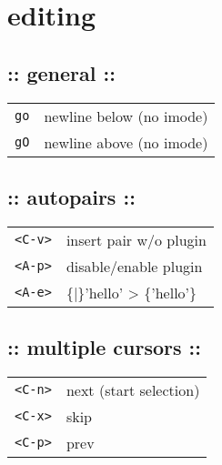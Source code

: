 \section{\hrulefill editing\hrulefill}
\subsection{:: general ::}
\begin{tabular}{@{}ll@{}}
    \verb!go!       & newline below (no imode) \\
    \verb!gO!       & newline above (no imode) \\
\end{tabular}

\subsection{:: autopairs ::}
\begin{tabular}{@{}ll@{}}
    \verb!<C-v>!    & insert pair w/o plugin \\
    \verb!<A-p>!    & disable/enable plugin \\
    \verb!<A-e>!    & \{|\}'hello' > \{'hello'\} \\
\end{tabular}

\subsection{:: multiple cursors ::}
\begin{tabular}{@{}ll@{}}
    \verb!<C-n>!    & next (start selection) \\
    \verb!<C-x>!    & skip \\
    \verb!<C-p>!    & prev \\
\end{tabular}

